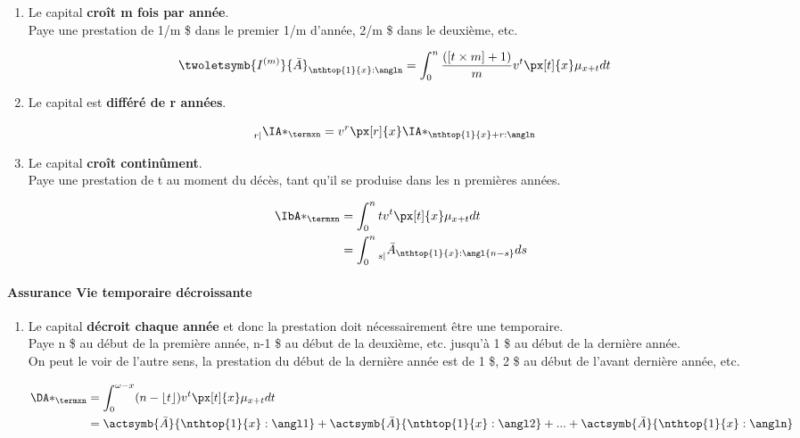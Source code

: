 \documentclass[10pt, french]{article}
\begin{document}
\begin{multicols*}{3}
\begin{enumerate}
	\item[] Le capital \textbf{croît m fois par année}.\\
	Paye une prestation de 1/m \$ dans le premier 1/m d'année, 2/m \$ dans le deuxième, etc.

\begin{align*}
	\twoletsymb{I^{(m)}}{\bar{A}}_{\nthtop{1}{x}:\angln} 
	&= \int_0^n \frac{([t \times m] + 1)}{m} v^t \px[t]{x} \mu_{x+t} dt 
\end{align*}


	\item[] Le capital est \textbf{différé de r années}.

\begin{align*}
	\prescript{}{r|}{\IA*_{\termxn}} 
	&= v^{r}\px[r]{x}\IA*_{\nthtop{1}{x} + r:\angln}
\end{align*}

	\item[] Le capital \textbf{croît continûment}.\\
	Paye une prestation de t au moment du décès, tant qu'il se produise dans les n premières années.

\begin{align*}
	\IbA*_{\termxn} 
	&=  \int_0^n t v^t \px[t]{x} \mu_{x+t} dt \\
	&= 	\int_0^n \prescript{}{s|}{\bar{A}_{\nthtop{1}{x}:\angl{n-s}}} ds
\end{align*}

\end{enumerate}

\paragraph{Assurance Vie temporaire décroissante} 


\begin{enumerate}

	\item[] Le capital \textbf{décroit chaque année} et donc la prestation doit nécessairement être une temporaire.\\
	Paye n \$ au début de la première année, n-1 \$ au début de la deuxième, etc. jusqu'à 1 \$ au début de la dernière année.\\
	On peut le voir de l'autre sens, la prestation du début de la dernière année est de 1 \$, 2 \$ au début de l'avant dernière année, etc. 
	
\begin{align*}
	\DA*_{\termxn}  &= \int_0^{\omega - x} (n - \lfloor t \rfloor) v^t \px[t]{x} \mu_{x+t} dt \\
		&= \actsymb{\bar{A}}{\nthtop{1}{x}:\angl1} + \actsymb{\bar{A}}{\nthtop{1}{x}:\angl2} + ... + \actsymb{\bar{A}}{\nthtop{1}{x}:\angln}
\end{align*}


\end{enumerate}
\end{multicols*}
\end{document}

